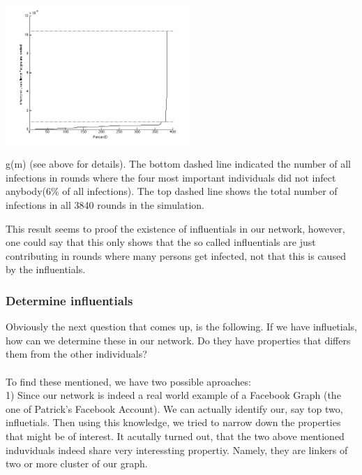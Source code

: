 \begin{minipage}{0.5\textwidth}
\includegraphics[width=7cm]{influ3}
\end{minipage}
\begin{minipage}{0.5\textwidth}
\caption{ g(m) (see above for details). The bottom dashed line indicated the number of all infections in rounds where the four most important individuals did not infect anybody(6\% of all infections). The top dashed line shows the total number of infections in all 3840 rounds in the simulation.}
\label{importancedist}
\end{minipage}

\noindent This result seems to proof the existence of influentials in our network, however, one could say that this only shows that the so called influentials are just contributing in rounds where many persons get infected, not that this is caused by the influentials.


\subsubsection{Determine influentials}

Obviously the next question that comes up, is the following. If we have influetials, how can we determine these in our network. Do they have properties that differs them from the other individuals? \\ 
\\
To find these mentioned, we have two possible aproaches: 
\\

1) Since our network is indeed a real world example of a Facebook Graph (the one of Patrick's Facebook Account). We can actually identify our, say top two, influetials. Then using this knowledge, we tried to narrow down the properties that might be of interest. 
It acutally turned out, that the two above mentioned induviduals indeed share very interessting propertiy. Namely, they are linkers of two or more cluster of our graph. 


